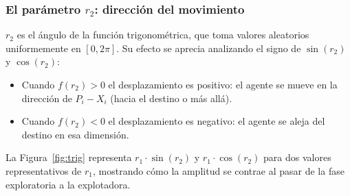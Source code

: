 \documentclass[12pt,a4paper]{article}
\begin{document}
\subsubsection{El parámetro $r_2$: dirección del movimiento}

$r_2$ es el ángulo de la función trigonométrica, que toma valores aleatorios uniformemente en $[0, 2\pi]$. Su efecto se aprecia analizando el signo de $\sin(r_2)$ y $\cos(r_2)$:

\begin{itemize}
  \item Cuando $f(r_2) > 0$ el desplazamiento es positivo: el agente se mueve en la dirección de $P_i - X_i$ (hacia el destino o más allá).
  \item Cuando $f(r_2) < 0$ el desplazamiento es negativo: el agente se aleja del destino en esa dimensión.
\end{itemize}

La Figura~\ref{fig:trig} representa $r_1 \cdot \sin(r_2)$ y $r_1 \cdot \cos(r_2)$ para dos valores representativos de $r_1$, mostrando cómo la amplitud se contrae al pasar de la fase exploratoria a la explotadora.
\end{document}
